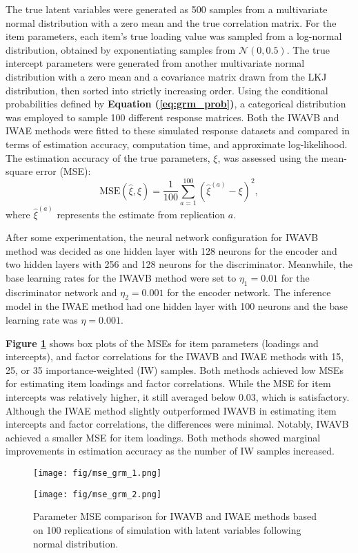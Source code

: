 \documentclass[a4paper,12pt]{article}
\theoremstyle{plain} %
\theoremstyle{remark} %
\theoremstyle{definition} %
\begin{document}
The true latent variables were generated as 500 samples from a multivariate normal distribution with a zero mean and the true correlation matrix. For the item parameters, each item's true loading value was sampled from a log-normal distribution, obtained by exponentiating samples from $\mathcal{N}(0, 0.5)$. The true intercept parameters were generated from another multivariate normal distribution with a zero mean and a covariance matrix drawn from the LKJ distribution, then sorted into strictly increasing order. Using the conditional probabilities defined by \textbf{Equation (\ref{eq:grm_prob})}, a categorical distribution was employed to sample 100 different response matrices. Both the IWAVB and IWAE methods were fitted to these simulated response datasets and compared in terms of estimation accuracy, computation time, and approximate log-likelihood. The estimation accuracy of the true parameters, $\xi$, was assessed using the mean-square error (MSE):
\begin{equation}\label{eq:mse}
    \text{MSE}(\hat{\xi},\xi) = \frac{1}{100}\sum\limits_{a=1}^{100}(\hat{\xi}^{(a)}-\xi)^2,
\end{equation}
where $\hat{\xi}^{(a)}$ represents the estimate from replication $a$.

After some experimentation, the neural network configuration for IWAVB method was decided as one hidden layer with 128 neurons for the encoder and two hidden layers with 256 and 128 neurons for the discriminator. Meanwhile, the base learning rates for the IWAVB method were set to $\eta_1=0.01$ for the discriminator network and $\eta_2=0.001$ for the encoder network. The inference model in the IWAE method had one hidden layer with 100 neurons and the base learning rate was $\eta=0.001$.

\textbf{Figure \ref{fig:mse_1}} shows box plots of the MSEs for item parameters (loadings and intercepts), and factor correlations for the IWAVB and IWAE methods with 15, 25, or 35 importance-weighted (IW) samples. Both methods achieved low MSEs for estimating item loadings and factor correlations. While the MSE for item intercepts was relatively higher, it still averaged below 0.03, which is satisfactory. Although the IWAE method slightly outperformed IWAVB in estimating item intercepts and factor correlations, the differences were minimal. Notably, IWAVB achieved a smaller MSE for item loadings. Both methods showed marginal improvements in estimation accuracy as the number of IW samples increased.
\begin{figure}[!htb]
  \centering
  \texttt{[image: fig/mse\_grm\_1.png]}
  
  \centering
  \texttt{[image: fig/mse\_grm\_2.png]}
  
  \caption{Parameter MSE comparison for IWAVB and IWAE methods based on 100 replications of simulation with latent variables following normal distribution.}
  \label{fig:mse_1}
\end{figure}
\end{document}
